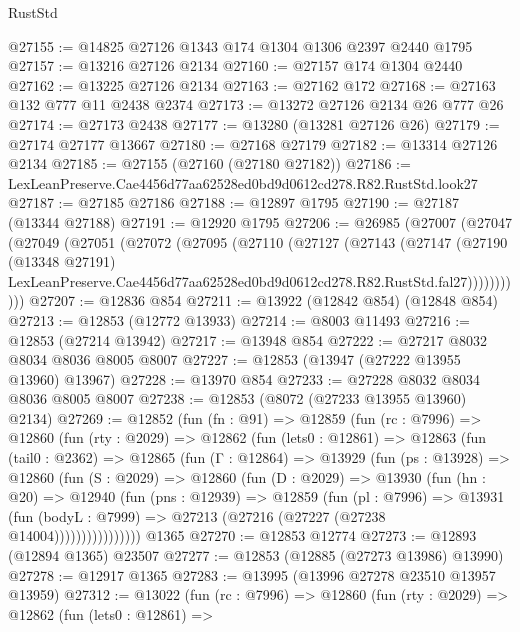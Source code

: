 \begin{lexlean}{RustStd}
\begin{coremodule}
@27155 := @14825 @27126 @1343 @174 @1304 @1306 @2397 @2440 @1795
@27157 := @13216 @27126 @2134
@27160 := @27157 @174 @1304 @2440
@27162 := @13225 @27126 @2134
@27163 := @27162 @172
@27168 := @27163 @132 @777 @11 @2438 @2374
@27173 := @13272 @27126 @2134 @26 @777 @26
@27174 := @27173 @2438
@27177 := @13280 (@13281 @27126 @26)
@27179 := @27174 @27177 @13667
@27180 := @27168 @27179
@27182 := @13314 @27126 @2134
@27185 := @27155 (@27160 (@27180 @27182))
@27186 := LexLeanPreserve.Cae4456d77aa62528ed0bd9d0612cd278.R82.RustStd.look27
@27187 := @27185 @27186
@27188 := @12897 @1795
@27190 := @27187 (@13344 @27188)
@27191 := @12920 @1795
@27206 := @26985
    (@27007
      (@27047
        (@27049
          (@27051
            (@27072
              (@27095
                (@27110
                  (@27127
                    (@27143
                      (@27147
                        (@27190
                          (@13348 @27191)
                          LexLeanPreserve.Cae4456d77aa62528ed0bd9d0612cd278.R82.RustStd.fal27)))))))))))
@27207 := @12836 @854
@27211 := @13922 (@12842 @854) (@12848 @854)
@27213 := @12853 (@12772 @13933)
@27214 := @8003 @11493
@27216 := @12853 (@27214 @13942)
@27217 := @13948 @854
@27222 := @27217 @8032 @8034 @8036 @8005 @8007
@27227 := @12853 (@13947 (@27222 @13955 @13960) @13967)
@27228 := @13970 @854
@27233 := @27228 @8032 @8034 @8036 @8005 @8007
@27238 := @12853 (@8072 (@27233 @13955 @13960) @2134)
@27269 := @12852
    (fun (fn : @91) =>
    @12859
      (fun (rc : @7996) =>
      @12860
        (fun (rty : @2029) =>
        @12862
          (fun (lets0 : @12861) =>
          @12863
            (fun (tail0 : @2362) =>
            @12865
              (fun (Γ : @12864) =>
              @13929
                (fun (ps : @13928) =>
                @12860
                  (fun (S : @2029) =>
                  @12860
                    (fun (D : @2029) =>
                    @13930
                      (fun (hn : @20) =>
                      @12940
                        (fun (pns : @12939) =>
                        @12859
                          (fun (pl : @7996) =>
                          @13931
                            (fun (bodyL : @7999) =>
                            @27213 (@27216 (@27227 (@27238 @14004))))))))))))))))
    @1365
@27270 := @12853 @12774
@27273 := @12893 (@12894 @1365) @23507
@27277 := @12853 (@12885 (@27273 @13986) @13990)
@27278 := @12917 @1365
@27283 := @13995 (@13996 @27278 @23510 @13957 @13959)
@27312 := @13022
    (fun (rc : @7996) =>
    @12860
      (fun (rty : @2029) =>
      @12862
        (fun (lets0 : @12861) =>

\end{coremodule}
\end{lexlean}
